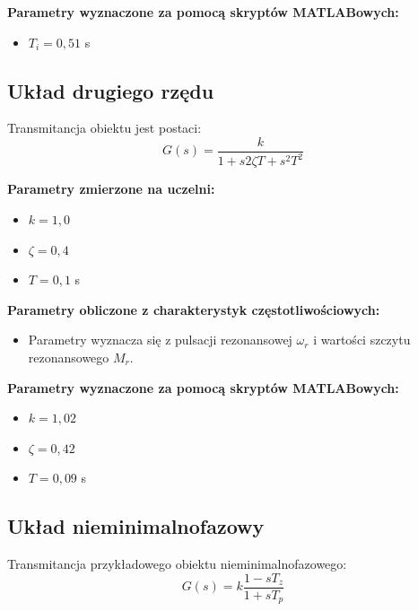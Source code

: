 \documentclass[12pt,a4paper]{article}
\begin{document}
	\noindent \textbf{Parametry wyznaczone za pomocą skryptów MATLABowych:}
	\begin{itemize}
		\item $T_i = 0{,}51$ s %
	\end{itemize}
	
	\subsection{Układ drugiego rzędu}
	Transmitancja obiektu jest postaci:
	\begin{equation}
		G(s) = \frac{k}{1+s 2\zeta T + s^2 T^2}
	\end{equation}
	
	\noindent \textbf{Parametry zmierzone na uczelni:}
	\begin{itemize}
		\item $k = 1{,}0$ %
		\item $\zeta = 0{,}4$ %
		\item $T = 0{,}1$ s %
	\end{itemize}
	
	\noindent \textbf{Parametry obliczone z charakterystyk częstotliwościowych:}
	\begin{itemize}
		\item Parametry wyznacza się z pulsacji rezonansowej $\omega_r$ i wartości szczytu rezonansowego $M_r$.
	\end{itemize}
	
	\noindent \textbf{Parametry wyznaczone za pomocą skryptów MATLABowych:}
	\begin{itemize}
		\item $k = 1{,}02$ %
		\item $\zeta = 0{,}42$ %
		\item $T = 0{,}09$ s %
	\end{itemize}
	
	\subsection{Układ nieminimalnofazowy}
	Transmitancja przykładowego obiektu nieminimalnofazowego:
	\begin{equation}
		G(s) = k \frac{1-sT_z}{1+sT_p}
	\end{equation}
	
\end{document}

